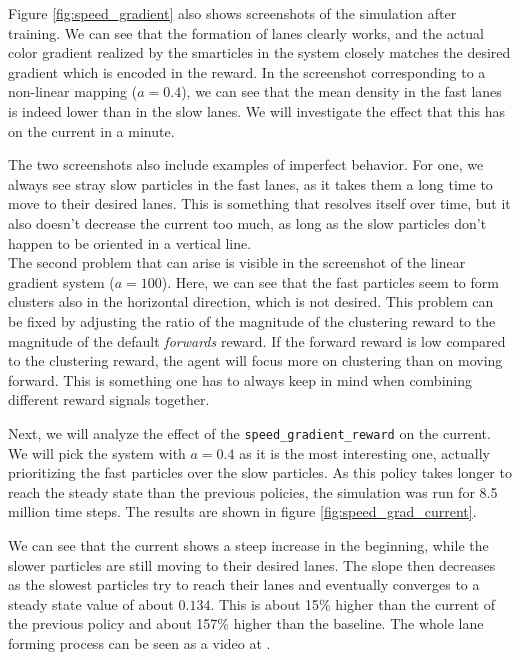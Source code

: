 Figure \ref{fig:speed_gradient} also shows screenshots of the simulation after training. We can see that the formation of lanes clearly works, and the actual color gradient realized by the smarticles in the system closely matches the desired gradient which is encoded in the reward. In the screenshot corresponding to a non-linear mapping ($a=0.4$), we can see that the mean density in the fast lanes is indeed lower than in the slow lanes. We will investigate the effect that this has on the current in a minute. 


The two screenshots also include examples of imperfect behavior. For one, we always see stray slow particles in the fast lanes, as it takes them a long time to move to their desired lanes. This is something that resolves itself over time, but it also doesn't decrease the current too much, as long as the slow particles don't happen to be oriented in a vertical line. 
\\
The second problem that can arise is visible in the screenshot of the linear gradient system ($a=100$). Here, we can see that the fast particles seem to form clusters also in the horizontal direction, which is not desired. This problem can be fixed by adjusting the ratio of the magnitude of the clustering reward to the magnitude of the default \textit{forwards} reward. If the forward reward is low compared to the clustering reward, the agent will focus more on clustering than on moving forward. This is something one has to always keep in mind when combining different reward signals together.


Next, we will analyze the effect of the \texttt{speed\_gradient\_reward} on the current. We will pick the system with $a=0.4$ as it is the most interesting one, actually prioritizing the fast particles over the slow particles. As this policy takes longer to reach the steady state than the previous policies, the simulation was run for 8.5 million time steps. The results are shown in figure \ref{fig:speed_grad_current}. 


We can see that the current shows a steep increase in the beginning, while the slower particles are still moving to their desired lanes. The slope then decreases as the slowest particles try to reach their lanes and eventually converges to a steady state value of about $0.134$. This is about 15\% higher than the current of the previous policy and about 157\% higher than the baseline. The whole lane forming process can be seen as a video at \cite{maertens_smarticle_lane_vid}.


